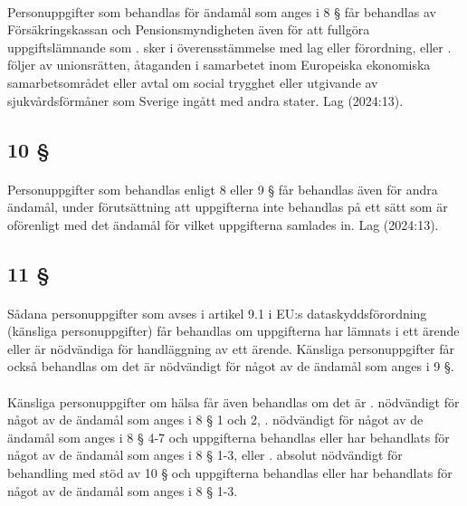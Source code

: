 \documentclass[a4paper,notitlepage,openany,10pt]{book}
\begin{document}
\paragraph*{}
Personuppgifter som behandlas för ändamål som anges i 8 § får behandlas av Försäkringskassan och Pensionsmyndigheten även för att fullgöra uppgiftslämnande som
. sker i överensstämmelse med lag eller förordning, eller
. följer av unionsrätten, åtaganden i samarbetet inom Europeiska ekonomiska samarbetsområdet eller avtal om social trygghet eller utgivande av sjukvårdsförmåner som Sverige ingått med andra stater.
Lag (2024:13).
\subsection*{10 §}
\paragraph*{}
Personuppgifter som behandlas enligt 8 eller 9 § får behandlas även för andra ändamål, under förutsättning att uppgifterna inte behandlas på ett sätt som är oförenligt med det ändamål för vilket uppgifterna samlades in.
Lag (2024:13).
\subsection*{11 §}
\paragraph*{}
Sådana personuppgifter som avses i artikel 9.1 i EU:s dataskyddsförordning (känsliga personuppgifter) får behandlas om uppgifterna har lämnats i ett ärende eller är nödvändiga för handläggning av ett ärende. Känsliga personuppgifter får också behandlas om det är nödvändigt för något av de ändamål som anges i 9 §.
\paragraph*{}
Känsliga personuppgifter om hälsa får även behandlas om det är
. nödvändigt för något av de ändamål som anges i 8 § 1 och 2,
. nödvändigt för något av de ändamål som anges i 8 § 4-7 och uppgifterna behandlas eller har behandlats för något av de ändamål som anges i 8 § 1-3, eller
. absolut nödvändigt för behandling med stöd av 10 § och uppgifterna behandlas eller har behandlats för något av de ändamål som anges i 8 § 1-3.
\end{document}
